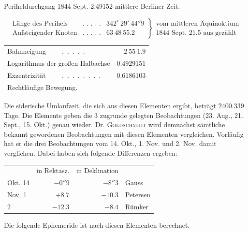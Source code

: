 \begin{center}
Periheldurchgang 1844 Sept. 2.49152 mittlere Berliner Zeit.
\end{center}
{\small
\[
\left.\begin{array}{llr}
\text{Länge des Perihels} & \text{.\ .\ .\ .\ .} & 342^\circ\ 29'\ 44''9 \\
\text{Aufsteigender Knoten} & \text{.\ .\ .\ .\ .} & 63\ 48\ 55.2
\end{array}\right\}
\begin{array}{l}
\text{vom mittleren Äquinoktium} \\
\text{1844 Sept. 21.5 aus gezählt}
\end{array}
\]
}
\begin{center}
\setlength{\tabcolsep}{4pt}
\begin{tabular}{llr}
Bahnneigung & \mbox{.\ .\ .\ .\ .} & $2\ 55\ 1.9$ \\
\multicolumn{2}{l}{Logarithmus der großen Halbachse} & $0.4929151$ \\
Exzentrizität & \mbox{.\ .\ .\ .\ .\ .\ .\ .} & $0.6186103$ \\
\multicolumn{3}{l}{Rechtläufige Bewegung.}
\end{tabular}
\end{center}

Die siderische Umlaufzeit, die sich aus diesen Elementen ergibt, beträgt 2400.339 Tage. Die Elemente geben die 3 zugrunde gelegten Beobachtungen (23. Aug., 21. Sept., 15. Okt.) genau wieder. Dr. \textsc{Goldschmidt} wird demnächst sämtliche bekannt gewordenen Beobachtungen mit diesen Elementen vergleichen. Vorläufig hat er die drei Beobachtungen vom 14. Okt., 1. Nov. und 2. Nov. damit verglichen. Dabei haben sich folgende Differenzen ergeben:

\begin{center}
\begin{tabular}{lrrl}
 & in Rektasz. & in Deklination & \\
Okt. 14 & $-0''9$ & $-8''3$ & Gauss \\
Nov. 1 & $+8.7$ & $-10.3$ & Petersen \\
\hfill 2 & $-12.3$ & $-8.4$ & Rümker \\
\end{tabular}
\end{center}

Die folgende Ephemeride ist nach diesen Elementen berechnet.

